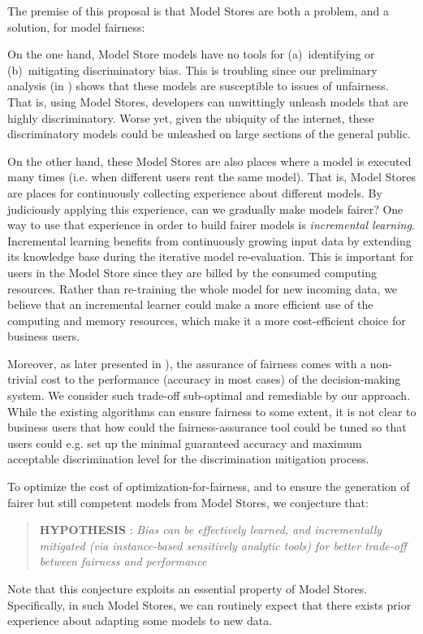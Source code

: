 The premise of this proposal is that  Model Stores are both a   problem, and a   solution, for model fairness:
\bi
\item
On the one hand, Model Store models  have no tools   for (a)~identifying or (b)~mitigating discriminatory bias. 
This is troubling since our preliminary analysis (in ) shows
that these models are  susceptible to issues of unfairness.
That is, using Model Stores, developers can unwittingly  unleash  models  
that are highly discriminatory. Worse yet, given the ubiquity of
the internet, these discriminatory models could be unleashed
on large sections of the general public.
\item
On the other hand, these Model Stores are also places where a model is   executed many times (i.e. when different users
rent the same model).  That is, Model Stores
are places for continuously collecting experience about different
models.   By  judiciously  applying  this experience, 
can we gradually make models fairer?
\ei
One way to use that experience in order to build fairer models is
{\em incremental learning}.
Incremental learning benefits from continuously growing input data by extending its knowledge base during the iterative model re-evaluation. This is important for users in the Model Store since they are billed by the consumed computing resources. Rather than re-training the whole model for new incoming data,  we believe that an incremental learner could make a more efficient use of the computing and memory resources, which make it a more cost-efficient choice for business users.   

Moreover, as later presented in ), the assurance of fairness comes with a non-trivial cost to the performance (accuracy in most cases) of the decision-making system. We consider such trade-off sub-optimal and remediable by our approach. While the existing algorithms can ensure fairness to some extent, it is not clear to business users that how could the fairness-assurance tool could be tuned so that users could e.g. set up the minimal guaranteed accuracy and maximum acceptable discrimination level for the discrimination mitigation process.


 
To optimize the cost of optimization-for-fairness, and to ensure the generation of fairer but still competent models
from Model Stores, we conjecture that:
\begin{quote}
{\bf HYPOTHESIS} : {\em
  Bias can be effectively learned, and incrementally mitigated  (via instance-based sensitively analytic tools) for better trade-off between fairness and performance}
  \end{quote}
Note that this conjecture exploits an essential property of 
Model Stores. Specifically, in such Model Stores,
we can routinely expect that there exists prior experience about adapting some models to new data. 

